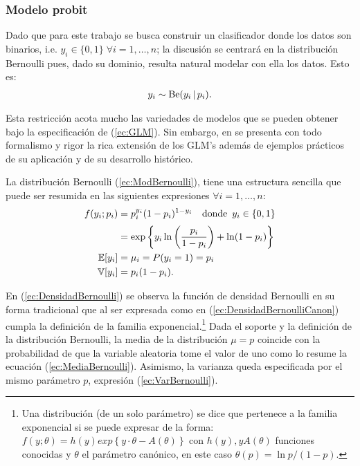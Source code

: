 \documentclass[../Main/Main.tex]{subfiles}
\begin{document}
\subsubsection*{Modelo probit}
Dado que para este trabajo se busca construir un clasificador donde los datos son binarios, i.e. $y_i \in \{0,1\} \; \forall i=1,\ldots,n$; la discusión se centrará en la distribución Bernoulli pues, dado su dominio, resulta natural modelar con ella los datos. Esto es: 
\begin{align}
	y_i \sim \text{Be}(y_i \, |\, p_i). \label{ec:ModBernoulli}
\end{align}

Esta restricción acota mucho las variedades de modelos que se pueden obtener bajo la especificación de (\ref{ec:GLM}). Sin embargo, en \citet{maccullagh1989generalized} se presenta con todo formalismo y rigor la rica extensión de los GLM's además de ejemplos prácticos de su aplicación y de su desarrollo histórico. 

La distribución Bernoulli (\ref{ec:ModBernoulli}), tiene una estructura sencilla que puede ser resumida en las siguientes expresiones $\forall i = 1,\ldots,n$:  
\begin{align}
	f(y_i;p_i) &= p_i^{y_i}(1 - p_i)^{1 - y_i}  \quad \text{donde }\, y_i \in \{0,1\} \label{ec:DensidadBernoulli} \\[2pt]
			&= \exp\left\{y_i\ln\left(\frac{p_i}{1 - p_i}\right) + \ln(1-p_i)\right\} \label{ec:DensidadBernoulliCanon}\\
	\mathbb{E}[y_i] &= \mu_i = P(y_i = 1) = p_i \label{ec:MediaBernoulli}\\
	\mathbb{V}[y_i] &= p_i(1 - p_i) \label{ec:VarBernoulli}. 
\end{align}

En (\ref{ec:DensidadBernoulli}) se observa la función de densidad Bernoulli en su forma tradicional que al ser expresada como en (\ref{ec:DensidadBernoulliCanon}) cumpla la definición de la familia exponencial.\footnote{Una distribución (de un solo parámetro) se dice que pertenece a la familia exponencial si se puede expresar de la forma: $f(y;\theta) = h(y)exp\left\{y\cdot\theta - A(\theta)\right\}$ con $h(y), y A(\theta)$ funciones conocidas y $\theta$ el parámetro canónico, en este caso $\theta(p) = \ln p/(1-p)$.} Dada el soporte y la definición de la distribución Bernoulli, la media de la distribución $\mu = p$ coincide con la probabilidad de que la variable aleatoria tome el valor de uno como lo resume la ecuación (\ref{ec:MediaBernoulli}). Asimismo, la varianza queda especificada por el mismo parámetro $p$, expresión (\ref{ec:VarBernoulli}). 
\end{document}
